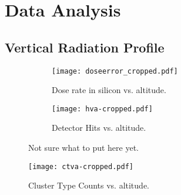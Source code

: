 \section{Data Analysis}
\label{Data Analysis}

\subsection{Vertical Radiation Profile}
\begin{figure}[H]
\centering
\begin{subfigure}{.5\textwidth}
  \centering
  \texttt{[image: doseerror\_cropped.pdf]}
  \caption{Dose rate in silicon vs. altitude.}
  \label{fig:sub1}
\end{subfigure}%
\begin{subfigure}{.5\textwidth}
  \centering
  \texttt{[image: hva-cropped.pdf]}
  \caption{Detector Hits vs. altitude.}
  \label{fig:sub2}
\end{subfigure}
\caption{Not sure what to put here yet.}
\label{fig:test}
\end{figure}

\begin{figure}[H]
\centering
\caption{Cluster Type Counts vs. altitude.}
\texttt{[image: ctva-cropped.pdf]}
\end{figure}
